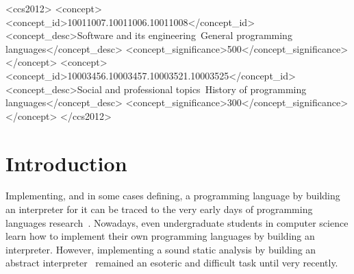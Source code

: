 \documentclass[acmsmall, review]{acmart}\settopmatter{}
\begin{document}
\begin{CCSXML}
<ccs2012>
  <concept>
    <concept_id>10011007.10011006.10011008</concept_id>
    <concept_desc>Software and its engineering~General programming languages</concept_desc>
    <concept_significance>500</concept_significance>
  </concept>
  <concept>
    <concept_id>10003456.10003457.10003521.10003525</concept_id>
    <concept_desc>Social and professional topics~History of programming languages</concept_desc>
    <concept_significance>300</concept_significance>
  </concept>
</ccs2012>
\end{CCSXML}




\maketitle


\section{Introduction}

Implementing, and in some cases defining, a programming language by building an 
interpreter for it can be traced to the very early days of programming languages 
research~\cite{McCarthy:1960:RFS:367177.367199,landin1966next,Reynolds:72}.
Nowadays, even undergraduate students in computer science learn how to implement
their own programming languages by building an interpreter.
However, implementing a sound static analysis by building an
abstract interpreter~\cite{cousot1977abstract} remained an esoteric and difficult 
task until very recently.
\end{document}
